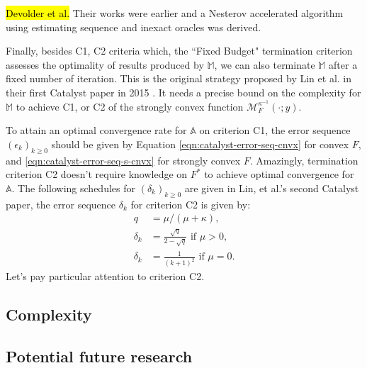 \documentclass[12pt]{article}
\begin{document}
        {\hl{Devolder et al.}}
        Their works were earlier and a Nesterov accelerated algorithm using estimating sequence and inexact oracles was derived. 
        \par
        Finally, besides C1, C2 criteria which, the ``Fixed Budget" termination criterion assesses the optimality of results produced by $\mathbb M$, we can also terminate $\mathbb M$ after a fixed number of iteration. 
        This is the original strategy proposed by Lin et al. in their first Catalyst paper in 2015 \cite{lin_universal_2015}. 
        It needs a precise bound on the complexity for $\mathbb M$ to achieve C1, or C2 of the strongly convex function $\mathcal M^{\kappa^{-1}}_F(\cdot; y)$. 
        \par
        To attain an optimal convergence rate for $\mathbb A$ on criterion C1, the error sequence $(\epsilon_k)_{k \ge 0}$ should be given by Equation \ref{eqn:catalyst-error-seq-cnvx} for convex $F$, and \ref{eqn:catalyst-error-seq-s-cnvx} for strongly convex $F$. 
        Amazingly, termination criterion C2 doesn't require knowledge on $F^*$ to achieve optimal convergence for $\mathbb A$. 
        The following schedules for $(\delta_k)_{k \ge 0}$ are given in Lin, et al.'s second Catalyst paper, the error sequence $\delta_k$ for criterion C2 is given by: 
        \begin{align*}\label{eqn:catalyst-rel-error-seq}
            q &= \mu/(\mu + \kappa), 
            \\
            \delta_k 
            &= \frac{\sqrt{q}}{2 - \sqrt{q}} \text{ if } \mu > 0, 
            \\
            \delta_k &= \frac{1}{(k + 1)^2} \text{ if }\mu = 0. 
        \end{align*}
        Let's pay particular attention to criterion C2. 
        


    \subsection{Complexity}
        
        
    \subsection{Potential future research}
\end{document}
